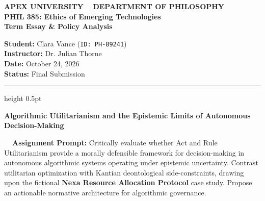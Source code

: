 \documentclass[11pt,a4paper]{article}
\begin{document}
\begin{assignmentheader}
\begin{minipage}[t]{0.60\textwidth}
    {\scriptsize\bfseries\color{burgundy}\uppercase{Apex University \textbullet~ Department of Philosophy}}\\[0.1em]
    {\Large\bfseries\color{navyblue} PHIL 385: Ethics of Emerging Technologies}\\[0.12em]
    {\large\bfseries\color{charcoal} Term Essay \& Policy Analysis}
\end{minipage}%
\begin{minipage}[t]{0.40\textwidth}
    \raggedleft \small
    \textbf{Student:} Clara Vance (\texttt{ID: PH-89241})\\[0.08em]
    \textbf{Instructor:} Dr. Julian Thorne\\[0.08em]
    \textbf{Date:} October 24, 2026\\[0.08em]
    \textbf{Status:} Final Submission
\end{minipage}

\vspace{0.25em}
\hrule height 0.5pt \color{bordergray}
\vspace{0.25em}

{\raggedright\LARGE\bfseries\color{navyblue} Algorithmic Utilitarianism and the Epistemic Limits of Autonomous Decision-Making}\par
\end{assignmentheader}

\vspace{0.1em}

\begin{promptbox}
{\small\bfseries\color{burgundy}\faPen~\ Assignment Prompt:}
{\small Critically evaluate whether Act and Rule Utilitarianism provide a morally defensible framework for decision-making in autonomous algorithmic systems operating under epistemic uncertainty. Contrast utilitarian optimization with Kantian deontological side-constraints, drawing upon the fictional \textbf{Nexa Resource Allocation Protocol} case study. Propose an actionable normative architecture for algorithmic governance.}
\end{promptbox}

\vspace{0.1em}
\end{document}
